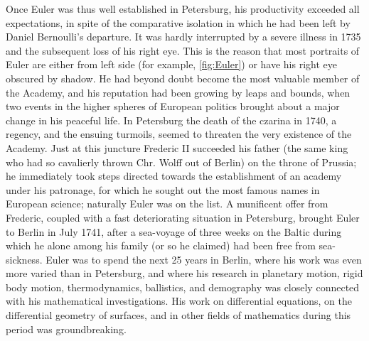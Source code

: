 \documentclass[b5paper]{article}
\begin{document}
\begin{mdframed}
Once Euler was thus well established in Petersburg, his productivity exceeded all expectations, in spite of the comparative isolation in which he had been left by Daniel Bernoulli's departure. It was hardly interrupted by a severe illness in 1735 and the subsequent loss of his right eye. This is the reason that most portraits of Euler are either from left side (for example, \cref{fig:Euler}) or have his right eye obscured by shadow. He had beyond doubt become the most valuable member of the Academy, and his reputation had been growing by leaps and bounds, when two events in the higher spheres of European politics brought about a major change in his peaceful life. In Petersburg the death of the czarina in 1740, a regency, and the ensuing turmoils, seemed to threaten the very existence of the Academy. Just at this juncture Frederic II succeeded his father (the same king who had so cavalierly thrown Chr. Wolff out of Berlin) on the throne of Prussia; he immediately took steps directed towards the establishment of an academy under his patronage, for which he sought out the most famous names in European science; naturally Euler was on the list. A munificent offer from Frederic, coupled with a fast deteriorating situation in Petersburg, brought Euler to Berlin in July 1741, after a sea-voyage of three weeks on the Baltic during which he alone among his family (or so he claimed) had been free from sea-sickness. Euler was to spend the next 25 years in Berlin, where his work was even more varied than in Petersburg, and where his research in planetary motion, rigid body motion, thermodynamics, ballistics, and demography was closely connected with his mathematical investigations. His work on differential equations, on the differential geometry of surfaces, and in other fields of mathematics during this period was groundbreaking.


\end{mdframed}
\end{document}
